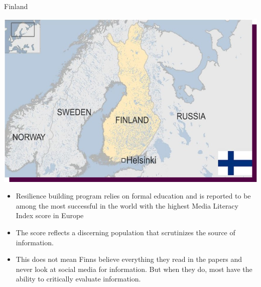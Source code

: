 \documentclass[nobackground,dvipsnames,table]{beamer}
\begin{document}
\begin{frame}{Finland}
\begin{minipage}{\textwidth}
    \centering \includegraphics[scale=.35]{img/fig16.jpg}
\end{minipage}

\begin{minipage}{\textwidth}
    \footnotesize{
    \begin{itemize}
        \item Resilience building program relies on formal education and is reported to be among the most successful in the world with the highest Media Literacy Index score in Europe
        \item The score reflects a discerning population that scrutinizes the source of information.
        \item This does not mean Finns believe everything they read in the papers and never look at social media for information. But when they do, most have the ability to critically evaluate information.
    \end{itemize}
    }
\end{minipage}

\end{frame}
\end{document}
